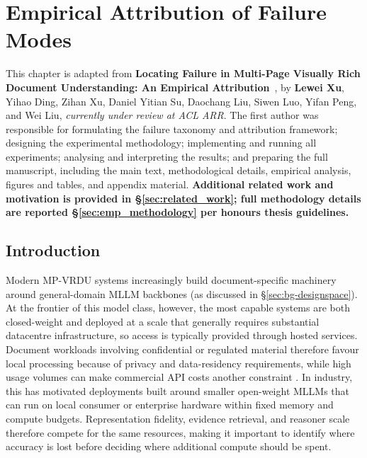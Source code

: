 \chapter{Empirical Attribution of Failure Modes}
\label{ch:empirical}



This chapter is adapted from \textbf{Locating Failure in Multi-Page Visually Rich Document Understanding: An Empirical Attribution}~\cite{xu2026locating}, by \textbf{Lewei Xu}, Yihao Ding, Zihan Xu, Daniel Yitian Su, Daochang Liu, Siwen Luo, Yifan Peng, and Wei Liu, \emph{currently under review at ACL ARR}. The first author was responsible for formulating the failure taxonomy and attribution framework; designing the experimental methodology; implementing and running all experiments; analysing and interpreting the results; and preparing the full manuscript, including the main text, methodological details, empirical analysis, figures and tables, and appendix material. \textbf{Additional related work and motivation is provided in \S\ref{sec:related_work}; full methodology details are reported \S\ref{sec:emp_methodology} per honours thesis guidelines.}

\section{Introduction}

Modern MP-VRDU systems increasingly build document-specific machinery around general-domain MLLM backbones (as discussed in \S\ref{sec:bg-designspace}). At the frontier of this model class, however, the most capable systems are both closed-weight and deployed at a scale that generally requires substantial datacentre infrastructure, so access is typically provided through hosted services. Document workloads involving confidential or regulated material therefore favour local processing because of privacy and data-residency requirements, while high usage volumes can make commercial API costs another constraint \citep{liang2026privacy,pan2025onprem}. In industry, this has motivated deployments built around smaller open-weight MLLMs that can run on local consumer or enterprise hardware within fixed memory and compute budgets. Representation fidelity, evidence retrieval, and reasoner scale therefore compete for the same resources, making it important to identify where accuracy is lost before deciding where additional compute should be spent.


